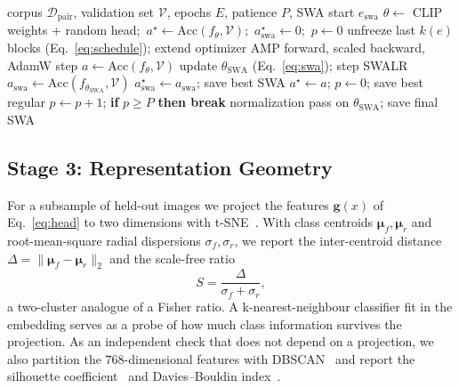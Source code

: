 \documentclass[10pt,journal]{IEEEtran}
\newcommand{\vect}[1]{\boldsymbol{#1}}
\begin{document}
\begin{algorithm}[!t]
\caption{PairCLIP-SWA Training and Checkpointing}
\label{alg:train}
\begin{algorithmic}[1]
\Require corpus $\mathcal{D}_{\mathrm{pair}}$, validation set $\mathcal{V}$,
         epochs $E$, patience $P$, SWA start $e_{\mathrm{swa}}$
\State $\theta\gets$ CLIP weights $+$ random head;\
       $a^\star\gets\mathrm{Acc}(f_\theta,\mathcal{V})$;\
       $a^\star_{\mathrm{swa}}\gets 0$;\ $p\gets 0$
\For{$e=0,\dots,E$}
    \State unfreeze last $k(e)$ blocks (Eq.~\eqref{eq:schedule}); extend optimizer
        \State AMP forward, scaled backward, AdamW step
    \EndFor
    \State $a\gets\mathrm{Acc}(f_\theta,\mathcal{V})$
        \State update $\theta_{\mathrm{SWA}}$ (Eq.~\eqref{eq:swa}); step SWALR
        \State $a_{\mathrm{swa}}\gets\mathrm{Acc}(f_{\theta_{\mathrm{SWA}}},\mathcal{V})$
        \If{$a_{\mathrm{swa}}>a^\star_{\mathrm{swa}}$}
            \State $a^\star_{\mathrm{swa}}\gets a_{\mathrm{swa}}$; save best SWA
        \EndIf
    \EndIf
     \State $a^\star\gets a$; $p\gets0$; save best regular
    \Else \State $p\gets p+1$; \textbf{if} $p\geq P$ \textbf{then break}
    \EndIf
\EndFor
\State normalization pass on $\theta_{\mathrm{SWA}}$; save final SWA
\end{algorithmic}
\end{algorithm}

\subsection{Stage 3: Representation Geometry}\label{sec:cluster-method}
For a subsample of held-out images we project the features $\vect{g}(x)$ of
Eq.~\eqref{eq:head} to two dimensions with t-SNE~\cite{maaten2008tsne}. With
class centroids $\vect{\mu}_f,\vect{\mu}_r$ and root-mean-square radial
dispersions $\sigma_f,\sigma_r$, we report the inter-centroid distance
$\Delta=\lVert\vect{\mu}_f-\vect{\mu}_r\rVert_2$ and the scale-free ratio
\begin{equation}
S=\frac{\Delta}{\sigma_f+\sigma_r},
\label{eq:sep}
\end{equation}
a two-cluster analogue of a Fisher ratio. A k-nearest-neighbour classifier fit
in the embedding serves as a probe of how much class information survives the
projection. As an independent check that does not depend on a projection, we
also partition the $768$-dimensional features with
DBSCAN~\cite{ester1996dbscan} and report the silhouette
coefficient~\cite{rousseeuw1987silhouette} and Davies--Bouldin
index~\cite{davies1979index}.
\end{document}
